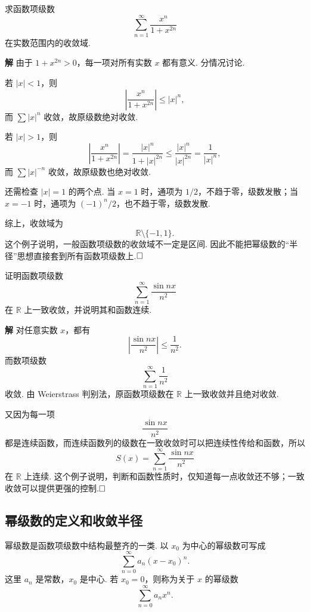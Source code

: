 \documentclass{ctexart}
\newenvironment{custom}[1]{\par\noindent \textbf{#1}\quad}{\par\vspace{1em}}
\begin{document}
\begin{example}
求函数项级数
\[
\sum_{n=1}^{\infty}\frac{x^n}{1+x^{2n}}
\]
在实数范围内的收敛域.
\end{example}

\begin{custom}{解}
由于 $1+x^{2n}>0$，每一项对所有实数 $x$ 都有意义. 分情况讨论.

若 $|x|<1$，则
\[
\left|\frac{x^n}{1+x^{2n}}\right|
\leqslant |x|^n,
\]
而 $\sum |x|^n$ 收敛，故原级数绝对收敛.

若 $|x|>1$，则
\[
\left|\frac{x^n}{1+x^{2n}}\right|
=\frac{|x|^n}{1+|x|^{2n}}
\leqslant \frac{|x|^n}{|x|^{2n}}
=\frac{1}{|x|^n},
\]
而 $\sum |x|^{-n}$ 收敛，故原级数也绝对收敛.

还需检查 $|x|=1$ 的两个点. 当 $x=1$ 时，通项为 $1/2$，不趋于零，级数发散；当 $x=-1$ 时，通项为 $(-1)^n/2$，也不趋于零，级数发散.

综上，收敛域为
\[
\mathbb{R}\setminus\{-1,1\}.
\]
这个例子说明，一般函数项级数的收敛域不一定是区间. 因此不能把幂级数的“半径”思想直接套到所有函数项级数上.$\hfill{\square}$
\end{custom}

\begin{example}
证明函数项级数
\[
\sum_{n=1}^{\infty}\frac{\sin nx}{n^2}
\]
在 $\mathbb{R}$ 上一致收敛，并说明其和函数连续.
\end{example}

\begin{custom}{解}
对任意实数 $x$，都有
\[
\left|\frac{\sin nx}{n^2}\right|\leqslant \frac{1}{n^2}.
\]
而数项级数
\[
\sum_{n=1}^{\infty}\frac{1}{n^2}
\]
收敛. 由 Weierstrass 判别法，原函数项级数在 $\mathbb{R}$ 上一致收敛并且绝对收敛.

又因为每一项
\[
\frac{\sin nx}{n^2}
\]
都是连续函数，而连续函数列的级数在一致收敛时可以把连续性传给和函数，所以
\[
S(x)=\sum_{n=1}^{\infty}\frac{\sin nx}{n^2}
\]
在 $\mathbb{R}$ 上连续. 这个例子说明，判断和函数性质时，仅知道每一点收敛还不够；一致收敛可以提供更强的控制.$\hfill{\square}$
\end{custom}

\subsection{幂级数的定义和收敛半径}

幂级数是函数项级数中结构最整齐的一类. 以 $x_0$ 为中心的幂级数可写成
\[
\sum_{n=0}^{\infty}a_n(x-x_0)^n.
\]
这里 $a_n$ 是常数，$x_0$ 是中心. 若 $x_0=0$，则称为关于 $x$ 的幂级数
\[
\sum_{n=0}^{\infty}a_nx^n.
\]
\end{document}
